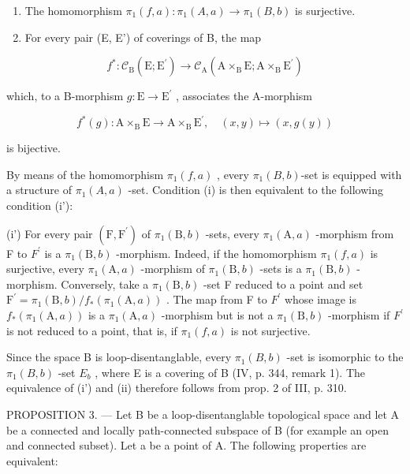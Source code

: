\begin{enumerate}
\def\labelenumi{(\roman{enumi})}
\item
  The homomorphism \(\pi_1(f,a)\colon \pi_1(A,a)\to \pi_1(B,b)\) is surjective.
\item
  For every pair (E, E') of coverings of B, the map
\end{enumerate}

\[
f ^ {*} \colon \mathscr {C} _ {\mathrm{B}} (\mathrm{E}; \mathrm{E} ^ {\prime}) \rightarrow \mathscr {C} _ {\mathrm{A}} (\mathrm{A} \times_ {\mathrm{B}} \mathrm{E}; \mathrm{A} \times_ {\mathrm{B}} \mathrm{E} ^ {\prime})
\]

which, to a B-morphism \(g\colon \mathrm{E}\to \mathrm{E}^{\prime}\) , associates the A-morphism

\[
f ^ {*} (g) \colon \mathrm{A} \times_ {\mathrm{B}} \mathrm{E} \rightarrow \mathrm{A} \times_ {\mathrm{B}} \mathrm{E} ^ {\prime}, \quad (x, y) \mapsto (x, g (y))
\]

is bijective.

By means of the homomorphism \(\pi_1(f, a)\) , every \(\pi_1(B, b)\)-set is equipped with a structure of \(\pi_1(A, a)\) -set. Condition (i) is then equivalent to the following condition (i'):

(i') For every pair \((\mathrm{F},\mathrm{F}^{\prime})\) of \(\pi_{1}(\mathrm{B},b)\) -sets, every \(\pi_{1}(\mathrm{A},a)\) -morphism from F to \(F^{\prime}\) is a \(\pi_{1}(\mathrm{B},b)\) -morphism. Indeed, if the homomorphism \(\pi_{1}(f,a)\) is surjective, every \(\pi_{1}(\mathrm{A},a)\) -morphism of \(\pi_{1}(\mathrm{B},b)\) -sets is a \(\pi_{1}(\mathrm{B},b)\) -morphism. Conversely, take a \(\pi_{1}(\mathrm{B},b)\) -set F reduced to a point and set \(\mathrm{F}^{\prime}=\pi_{1}(\mathrm{B},b)/f_{*}(\pi_{1}(\mathrm{A},a))\) . The map from F to \(F^{\prime}\) whose image is \(f_{*}(\pi_{1}(\mathrm{A},a))\) is a \(\pi_{1}(\mathrm{A},a)\) -morphism but is not a \(\pi_{1}(\mathrm{B},b)\) -morphism if \(F^{\prime}\) is not reduced to a point, that is, if \(\pi_{1}(f,a)\) is not surjective.

Since the space B is loop-disentanglable, every \(\pi_{1}(B,b)\) -set is isomorphic to the \(\pi_{1}(B,b)\) -set \(E_{b}\) , where E is a covering of B (IV, p. 344, remark 1). The equivalence of (i') and (ii) therefore follows from prop. 2 of III, p. 310.

PROPOSITION 3. --- Let B be a loop-disentanglable topological space and let A be a connected and locally path-connected subspace of B (for example an open and connected subset). Let a be a point of A. The following properties are equivalent:

